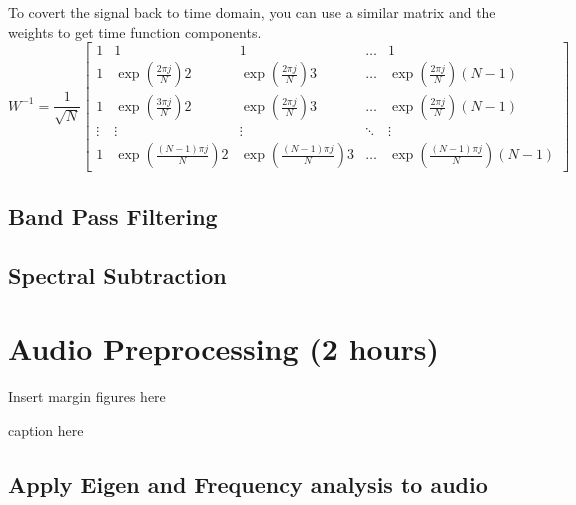 \documentclass{tufte-handout}
\begin{document}
To covert the signal back to time domain, you can use a similar matrix and the weights to get time function components. 
\begin{equation}\label{eq:basis_fns}
    W^{-1}=\dfrac{1}{\sqrt{N}}
\begin{bmatrix}
    1 & 1 & 1 & \dots  & 1 \\
    1 & \exp(\frac{2 \pi j}{N})2 & \exp(\frac{2 \pi j}{N})3 & \dots  & \exp(\frac{2 \pi j}{N})(N-1) \\
    1 & \exp(\frac{3 \pi j}{N})2 & \exp(\frac{2 \pi j}{N})3 & \dots  & \exp(\frac{2 \pi j}{N}) (N-1) \\
    \vdots & \vdots & \vdots & \ddots & \vdots \\
    1 & \exp(\frac{(N-1) \pi j}{N})2 & \exp(\frac{(N-1) \pi j}{N})3 & \dots  & \exp(\frac{(N-1) \pi j}{N}) (N-1)
\end{bmatrix}
\end{equation}

\subsection{Band Pass Filtering}

\subsection{Spectral Subtraction}



\section{Audio Preprocessing (2 hours)}

\begin{marginfigure}
Insert margin figures here
\caption{caption here}
\end{marginfigure}



\subsection{Apply Eigen and Frequency analysis to audio}

\end{document}
